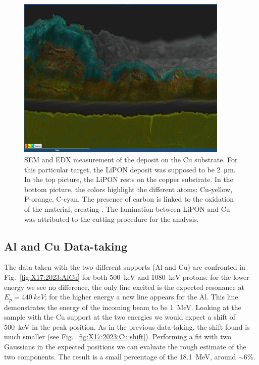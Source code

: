 \begin{refsection}
\begin{figure}
            \includegraphics[width = 0.9\textwidth]{Figures/X17/PSI_LiPON-atoms_picture.PNG}
            \caption[X17: SEM and EDX analisys of a LiPON target]{SEM and EDX measurement of the  deposit on the Cu substrate. For this particular target, the LiPON deposit was supposed to be \SI{2}{\micro m}. In the top picture, the LiPON rests on the copper substrate. In the bottom picture, the colors highlight the different atoms: Cu-yellow, P-orange, C-cyan. The presence of carbon is linked to the oxidation of the material, creating . The lamination between LiPON and Cu was attributed to the cutting procedure for the analysis.}
            \label{fig:X17:target:LiPON:psi}
        \end{figure}  

    \subsection{Al and Cu Data-taking} 
        The data taken with the two different supports (Al and Cu) are confronted in Fig.~\ref{fig:X17:2023:AlCu} for both \SI{500}{keV} and \SI{1080}{keV} protons: for the lower energy we see no difference, the only line excited is the expected resonance at $E_p=\SI{440}{keV}$; for the higher energy a new line appears for the Al. This line demonstrates the energy of the incoming beam to be \SI{1}{MeV}.
        Looking at the sample with the Cu support at the two energies we would expect a shift of \SI{500}{keV} in the peak position. As in the previous data-taking, the shift found is much smaller (see Fig.~\ref{fig:X17:2023:Cu:shift}). Performing a fit with two Gaussians in the expected positions we can evaluate the rough estimate of the two components. The result is a small percentage of the \SI{18.1}{MeV}, around $\sim6\%$.


\end{refsection}
